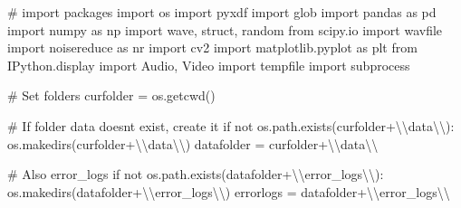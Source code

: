 \documentclass[
  letterpaper,
  DIV=11,
  numbers=noendperiod]{scrreprt}
\newenvironment{Shaded}{\begin{snugshade}}{\end{snugshade}}
\newcommand{\CharTok}[1]{\textcolor[rgb]{0.13,0.47,0.30}{#1}}
\newcommand{\CommentTok}[1]{\textcolor[rgb]{0.37,0.37,0.37}{#1}}
\newcommand{\ControlFlowTok}[1]{\textcolor[rgb]{0.00,0.23,0.31}{#1}}
\newcommand{\ImportTok}[1]{\textcolor[rgb]{0.00,0.46,0.62}{#1}}
\newcommand{\KeywordTok}[1]{\textcolor[rgb]{0.00,0.23,0.31}{#1}}
\newcommand{\NormalTok}[1]{\textcolor[rgb]{0.00,0.23,0.31}{#1}}
\newcommand{\OperatorTok}[1]{\textcolor[rgb]{0.37,0.37,0.37}{#1}}
\newcommand{\StringTok}[1]{\textcolor[rgb]{0.13,0.47,0.30}{#1}}
\begin{document}
\begin{Shaded}
\begin{Highlighting}[]
\CommentTok{\# import packages}
\ImportTok{import}\NormalTok{ os}
\ImportTok{import}\NormalTok{ pyxdf}
\ImportTok{import}\NormalTok{ glob}
\ImportTok{import}\NormalTok{ pandas }\ImportTok{as}\NormalTok{ pd}
\ImportTok{import}\NormalTok{ numpy }\ImportTok{as}\NormalTok{ np}
\ImportTok{import}\NormalTok{ wave, struct, random}
\ImportTok{from}\NormalTok{ scipy.io }\ImportTok{import}\NormalTok{ wavfile}
\ImportTok{import}\NormalTok{ noisereduce }\ImportTok{as}\NormalTok{ nr}
\ImportTok{import}\NormalTok{ cv2}
\ImportTok{import}\NormalTok{ matplotlib.pyplot }\ImportTok{as}\NormalTok{ plt}
\ImportTok{from}\NormalTok{ IPython.display }\ImportTok{import}\NormalTok{ Audio, Video}
\ImportTok{import}\NormalTok{ tempfile}
\ImportTok{import}\NormalTok{ subprocess}


\CommentTok{\# Set folders}
\NormalTok{curfolder }\OperatorTok{=}\NormalTok{ os.getcwd()}

\CommentTok{\# If folder data doesn\textquotesingle{}t exist, create it}
\ControlFlowTok{if} \KeywordTok{not}\NormalTok{ os.path.exists(curfolder}\OperatorTok{+}\StringTok{\textquotesingle{}}\CharTok{\textbackslash{}\textbackslash{}}\StringTok{data}\CharTok{\textbackslash{}\textbackslash{}}\StringTok{\textquotesingle{}}\NormalTok{):}
\NormalTok{    os.makedirs(curfolder}\OperatorTok{+}\StringTok{\textquotesingle{}}\CharTok{\textbackslash{}\textbackslash{}}\StringTok{data}\CharTok{\textbackslash{}\textbackslash{}}\StringTok{\textquotesingle{}}\NormalTok{)}
\NormalTok{datafolder }\OperatorTok{=}\NormalTok{ curfolder}\OperatorTok{+}\StringTok{\textquotesingle{}}\CharTok{\textbackslash{}\textbackslash{}}\StringTok{data}\CharTok{\textbackslash{}\textbackslash{}}\StringTok{\textquotesingle{}}

\CommentTok{\# Also error\_logs}
\ControlFlowTok{if} \KeywordTok{not}\NormalTok{ os.path.exists(datafolder}\OperatorTok{+}\StringTok{\textquotesingle{}}\CharTok{\textbackslash{}\textbackslash{}}\StringTok{error\_logs}\CharTok{\textbackslash{}\textbackslash{}}\StringTok{\textquotesingle{}}\NormalTok{):}
\NormalTok{    os.makedirs(datafolder}\OperatorTok{+}\StringTok{\textquotesingle{}}\CharTok{\textbackslash{}\textbackslash{}}\StringTok{error\_logs}\CharTok{\textbackslash{}\textbackslash{}}\StringTok{\textquotesingle{}}\NormalTok{)}
\NormalTok{errorlogs }\OperatorTok{=}\NormalTok{ datafolder}\OperatorTok{+}\StringTok{\textquotesingle{}}\CharTok{\textbackslash{}\textbackslash{}}\StringTok{error\_logs}\CharTok{\textbackslash{}\textbackslash{}}\StringTok{\textquotesingle{}}


\end{Highlighting}
\end{Shaded}
\end{document}
